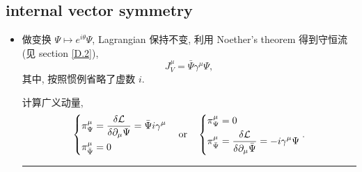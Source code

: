 \subsection{internal vector symmetry} \label{subsection 7.3.1}
\begin{itemize}
	\item 做变换 $\Psi \mapsto e^{i \theta} \Psi$, Lagrangian 保持不变, 利用 Noether's theorem 得到守恒流 (见 section \ref{D.2}),
	\begin{equation} \label{7.3.3}
		J_V^\mu = \bar{\Psi} \gamma^\mu \Psi,
	\end{equation}
	其中, 按照惯例省略了虚数 $i$.
	
	\begin{tcolorbox}[title=calculation:]
		计算广义动量,
		\begin{equation} \label{7.3.4}
			\begin{dcases}
				\pi_\Psi^\mu = \frac{\delta \mathcal{L}}{\delta \partial_\mu \Psi} = \bar{\Psi} i \gamma^\mu \\
				\pi_{\bar{\Psi}}^\mu = 0
			\end{dcases} \quad \text{or} \quad \begin{dcases}
				\pi_\Psi^\mu = 0 \\
				\pi_{\bar{\Psi}}^\mu = \frac{\delta \mathcal{L}}{\delta \partial_\mu \bar{\Psi}} = - i \gamma^\mu \Psi
			\end{dcases}.
		\end{equation}
		
		\noindent\rule[0.5ex]{\linewidth}{0.5pt} %
		

\end{tcolorbox}
\end{itemize}
